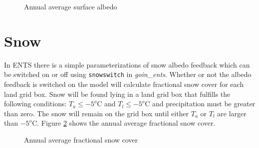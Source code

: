 \documentclass[10pt,a4paper]{report}
\begin{document}
\begin{figure}
\centerline{}
\caption{Annual average surface albedo}\label{albedo_surf}
\end{figure}

\section{Snow}

In ENTS there is a simple parameterizations of snow albedo feedback
which can be switched on or off using {\tt snowswitch} in {\em
goin\_ents}. Whether or not the albedo feedback is switched on the
model will calculate fractional snow cover for each land grid box.
Snow will be found lying in a land grid box that fulfills the
following conditions: $T_{a}\leq -5^{o}$C and $T_{l}\leq -5^{o}$C
and precipitation must be greater than zero. The snow will remain on
the grid box until either $T_{a}$ or $T_{l}$ are larger than
$-5^{o}$C. Figure \ref{snow} shows the annual average fractional
snow cover.

\begin{figure}
\centerline{}
\caption{Annual average fractional snow cover}\label{snow}
\end{figure}
\end{document}
